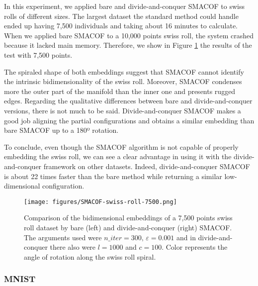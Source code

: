 In this experiment, we applied bare and divide-and-conquer SMACOF to swiss rolls of different sizes. The largest dataset the standard method could handle ended up having 7,500 individuals and taking about 16 minutes to calculate. When we applied bare SMACOF to a 10,000 points swiss roll, the system crashed because it lacked main memory. Therefore, we show in Figure \ref{fig:SMACOF-swiss-roll-7500} the results of the test with 7,500 points.

The spiraled shape of both embeddings suggest that SMACOF cannot identify the intrinsic bidimensionality of the swiss roll. Moreover, SMACOF condenses more the outer part of the manifold than the inner one and presents rugged edges. Regarding the qualitative differences between bare and divide-and-conquer versions, there is not much to be said. Divide-and-conquer SMACOF makes a good job aligning the partial configurations and obtains a similar embedding than bare SMACOF up to a 180º rotation.

To conclude, even though the SMACOF algorithm is not capable of properly embedding the swiss roll, we can see a clear advantage in using it with the divide-and-conquer framework on other datasets. Indeed, divide-and-conquer SMACOF is about 22 times faster than the bare method while returning a similar low-dimensional configuration.

\begin{figure}
    \centering
    \texttt{[image: figures/SMACOF-swiss-roll-7500.png]}
    \caption{Comparison of the bidimensional embeddings of a 7,500 points swiss roll dataset \citep{Spiwokv2007} by bare (left) and divide-and-conquer (right) SMACOF. The arguments used were $n\_iter = 300,\, \varepsilon = 0.001$ and in divide-and-conquer there also were $l=1000$ and $c=100$. Color represents the angle of rotation along the swiss roll spiral.}
    \label{fig:SMACOF-swiss-roll-7500}
\end{figure}


\subsubsection{MNIST}
\label{sec:dc-SMACOF-MNIST}

